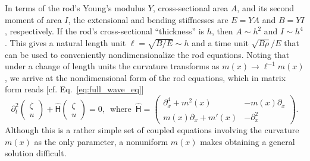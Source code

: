 In terms of the rod's Young's modulus $Y$, cross-sectional area $A$, and its second moment of area $I$, the extensional and bending stiffnesses are $E = YA$ and $B = YI$, respectively.
If the rod's cross-sectional ``thickness'' is $h$, then $A \sim h^2$ and $I \sim h^{4}$.
This gives a natural length unit $\ell = \sqrt{B/E} \sim h$ and a time unit $\sqrt{B\rho}/E$ that can be used to conveniently nondimensionalize the rod equations.
Noting that under a change of length units the curvature transforms as $m(x) \to \ell^{-1}m(x)$, we arrive at the nondimensional form of the rod equations, which in matrix form reads [cf. Eq.~\eqref{eq:full_wave_eq}]
%
\begin{equation}
\partial_{t}^{2}
\begin{pmatrix}
  \zeta\\
  u
\end{pmatrix} +
\widehat{\mathsf{H}}
\begin{pmatrix}
  \zeta\\
  u
\end{pmatrix} = 0,
\enspace
\text{where}
\enspace
\widehat{\mathsf{H}}
=
\begin{pmatrix}
  \partial^{4}_{x} + m^{2}(x) & -m(x)\partial_{x}\\
  m(x)\partial_{x} + m'(x) & -\partial^{2}_{x}
\end{pmatrix}.
\label{eq:rod}
\end{equation}
%
Although this is a rather simple set of coupled equations involving the curvature $m(x)$ as the only parameter, a nonuniform $m(x)$ makes obtaining a general solution difficult.

